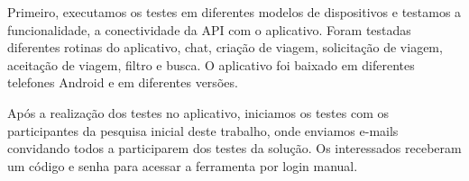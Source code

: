 Primeiro, executamos os testes em diferentes modelos de dispositivos e testamos a funcionalidade, a conectividade da API com o aplicativo. Foram testadas diferentes rotinas do aplicativo, chat, criação de viagem, solicitação de viagem, aceitação de viagem, filtro e busca. O aplicativo foi baixado em diferentes telefones Android e em diferentes versões.

Após a realização dos testes no aplicativo, iniciamos os testes com os participantes da pesquisa inicial deste trabalho, onde enviamos e-mails convidando todos a participarem dos testes da solução. Os interessados receberam um código e senha para acessar a ferramenta por login manual.

